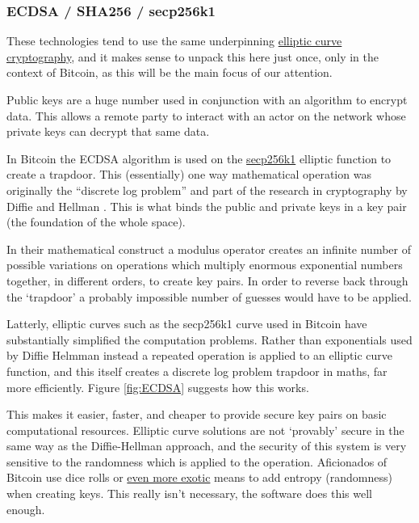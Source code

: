\subsubsection{ECDSA / SHA256 / secp256k1}
These technologies tend to use the same underpinning \href{https://curves.ulfheim.net/}{elliptic curve cryptography}, and it makes sense to unpack this here just once, only in the context of Bitcoin, as this will be the main focus of our attention.\par
Public keys are a huge number used in conjunction with an algorithm to encrypt data. This allows a remote party to interact with an actor on the network whose private keys can decrypt that same data.\par
In Bitcoin the ECDSA algorithm is used on the \href{https://en.bitcoin.it/wiki/Secp256k1}{secp256k1} elliptic function to create a trapdoor. This (essentially) one way mathematical operation was originally the ``discrete log problem'' and part of the research in cryptography by Diffie and Hellman \cite{diffie1976new}. This is what binds the public and private keys in a key pair (the foundation of the whole space).\par 
In their mathematical construct a modulus operator creates an infinite number of possible variations on operations which multiply enormous exponential numbers together, in different orders, to create key pairs. In order to reverse back through the `trapdoor' a probably impossible number of guesses would have to be applied.\par
Latterly, elliptic curves such as the secp256k1 curve used in Bitcoin have substantially simplified the computation problems. Rather than exponentials used by Diffie Helmman instead a repeated operation is applied to an elliptic curve function, and this itself creates a discrete log problem trapdoor in maths, far more efficiently. Figure \ref{fig:ECDSA} suggests how this works. \par
This makes it easier, faster, and cheaper to provide secure key pairs on basic computational resources. Elliptic curve solutions are not `provably' secure in the same way as the Diffie-Hellman approach, and the security of this system is very sensitive to the randomness which is applied to the operation. Aficionados of Bitcoin use dice rolls or \href{https://www.hackster.io/news/alex-waltz-s-quantum-random-number-generator-for-bitcoin-uses-radioactive-decay-and-a-raspberry-pi-25a75316220f}{even more exotic} means to add entropy (randomness) when creating keys. This really isn't necessary, the software does this well enough.\par  
